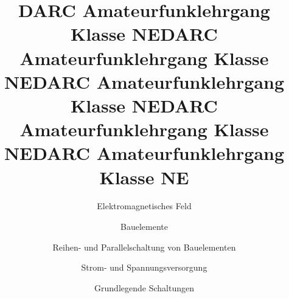 \documentclass[aspectratio = 169]{beamer}
\begin{document}
\title{DARC Amateurfunklehrgang Klasse NE}
\author{Elektromagnetisches Feld}
\begin{frame}
\maketitle
\end{frame}





\title{DARC Amateurfunklehrgang Klasse NE}
\author{Bauelemente}
\begin{frame}
\maketitle
\end{frame}






\title{DARC Amateurfunklehrgang Klasse NE}
\author{Reihen- und Parallelschaltung von Bauelementen}
\begin{frame}
\maketitle
\end{frame}





\title{DARC Amateurfunklehrgang Klasse NE}
\author{Strom- und Spannungsversorgung}
\begin{frame}
\maketitle
\end{frame}







\title{DARC Amateurfunklehrgang Klasse NE}
\author{Grundlegende Schaltungen}
\begin{frame}
\maketitle
\end{frame}






\end{document}

